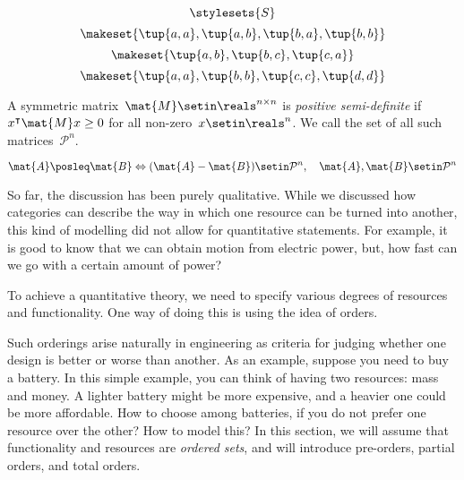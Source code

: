 {\begin{forslides}
        \begin{equation}
            \label{eq:pow_7}
            \stylesets{S}
        \end{equation}
        \begin{equation}
            \label{eq:pre_ex1}
            \makeset{\tup{a,a},\tup{a,b},\tup{b,a},\tup{b,b}}
        \end{equation}
        \begin{equation}
            \label{eq:pre_ex2}
            \makeset{\tup{a,b},\tup{b,c},\tup{c,a}}
        \end{equation}
        \begin{equation}
            \label{eq:pre_ex3}
            \makeset{\tup{a,a},\tup{b,b},\tup{c,c},\tup{d,d}}
        \end{equation}
        \begin{definition}
            \label{def:posdef}
            A symmetric matrix~$\mat{M}\setin \reals^{n\times n}$ is \emph{positive semi-definite} if~$x^\intercal \mat{M}x\geq 0$ for all non-zero~$x\setin \reals^n$.
            We call the set of all such matrices~$\mathcal{P}^n$.
        \end{definition}
        \begin{equation}
            \label{eq:posdef_1}
            \mat{A}\posleq \mat{B} \Leftrightarrow (\mat{A}-\mat{B})\setin \mathcal{P}^n, \quad \mat{A},\mat{B}\setin \mathcal{P}^n
        \end{equation}
    \end{forslides}
}

So far, the discussion has been purely qualitative.
While we discussed how categories can describe the way in which one resource can be turned into another, this kind of modelling did not allow for quantitative statements.
For example, it is good to know that we can obtain motion from electric power, but, how fast can we go with a certain amount of power?

To achieve a quantitative theory, we need to specify various degrees of resources and functionality.
One way of doing this is using the idea of orders.

Such orderings arise naturally in engineering as criteria for judging whether one design is better or worse than another.
As an example, suppose you need to buy a battery.
In this simple example, you can think of having two resources: mass and money.
A lighter battery might be more expensive, and a heavier one could be more affordable.
How to choose among batteries, if you do not prefer one resource over the other?
How to model this?
In this section, we will assume that functionality and resources are \emph{ordered sets}, and will introduce pre-orders, partial orders, and total orders.

